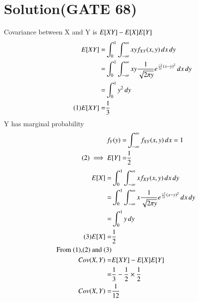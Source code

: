 \documentclass[journal,12pt,twocolumn]{IEEEtran}
\begin{document}
\section*{\textbf{Solution(GATE 68)}}
Covariance between X and Y is $E[ XY ]-E[ X ]E[ Y ]$\\
\begin{align*}
    E[ XY ]=&\int_{0}^{1}\int_{-\infty}^{\infty}xy f_{XY}(x,y)\,dx\,dy\\
    =&\int_{0}^{1}\int_{-\infty}^{\infty}xy\frac{1}{\sqrt{2\pi y}}e^{\frac{-1}{2y}(x-y)^2}\,dx \,dy\\
    =&\int_{0}^{1}y^2 \,dy\\
    \tag{1}
    E[ XY ]=&\frac{1}{3}
\end{align*}
Y has marginal probability
\begin{align*}
    f_Y(y)=&\int_{-\infty}^{\infty}f_{XY}(x,y)\,dx =1\\
    \tag{2}
    \implies E[ Y ]=&\frac{1}{2}
\end{align*}
\begin{align*}
 E[ X ]=&\int_{0}^{1}\int_{-\infty}^{\infty}x f_{XY}(x,y)\,dx\,dy\\
    =&\int_{0}^{1}\int_{-\infty}^{\infty}x\frac{1}{\sqrt{2\pi y}}e^{\frac{-1}{2y}(x-y)^2}\,dx \,dy\\
    =&\int_{0}^{1}y\,dy\\
    \tag{3}
E[ X ]=&\frac{1}{2}\\
\text{From (1),(2) and (3)}\\
Cov(X,Y)=&E[ XY ]-E[ X ]E[ Y ]\\
       =&\frac{1}{3}-\frac{1}{2}\times \frac{1}{2}\\
Cov(X,Y)=&\frac{1}{12}
\end{align*}
\end{document}
